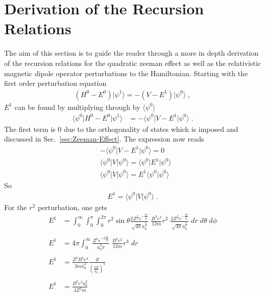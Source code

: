\chapter{Derivation of the Recursion Relations}
    The aim of this section is to guide the reader through a more in depth derivation of the recursion relations for the quadratic zeeman effect as well as the relativistic magnetic dipole operator perturbations to the Hamiltonian. Starting with the first order perturbation equation
    \begin{align}
        \left(H^0 - E^0 \right) \vert \psi^1 \rangle = -\left( V - E^1  \right) \vert \psi^0 \rangle\;,
    \end{align}
    \noindent $E^1$ can be found by multiplying through by $\langle \psi^0 \vert$
    \begin{align}
        \langle \psi^0 \vert H^0 - E^0 \vert \psi^1 \rangle &= -\langle \psi^0 \vert V - E^1 \vert \psi^0 \rangle \;.
    \end{align}
    \noindent The first term is $0$ due to the orthogonality of states which is imposed and discussed in Sec.~\ref{sec:Zeeman-Effect}. The expression now reads 
    \begin{align*}
        &-\langle \psi^0 \vert V - E^1 \vert \psi^0 \rangle = 0 \\
        &\langle \psi^0 \vert V \vert \psi^0 \rangle =  \langle \psi^0 \vert E^1 \vert \psi^0 \rangle\\
        &\langle \psi^0 \vert V \vert \psi^0 \rangle =  E^1 \langle \psi^0 \vert \psi^0 \rangle
    \end{align*}
    \noindent So 
    \begin{align}
        E^1 = \langle \psi^0 \vert V \vert \psi^0 \rangle\;.
    \end{align}
    \noindent For the $r^2$ perturbation, one gets 
    \begin{align*}
        E^1 &= \int^\infty_0\int_0^\pi  \int_0^{2\pi} r^2 \sin\theta \frac{2Z^{\frac{3}{2}} e^{-\frac{Zr}{\bar{a}_0}}}{\sqrt{4\pi} \bar{a}_0^{\frac{3}{2}}} \; \frac{B^2e^2}{12m}r^2\;  \frac{2Z^{\frac{3}{2}} e^{-\frac{Zr}{\bar{a}_0}}}{\sqrt{4\pi} \bar{a}_0^{\frac{3}{2}}} \;dr\; d\theta\; d\phi\\ \nonumber\\
        E^1 &= {4\pi} \int_0^\infty \frac{Z^3 e^{-2\frac{Zr}{\bar{a}_0}}}{\bar{a}_0^3\pi} \; \frac{B^2e^2}{12m}r^4 \;dr\\ \nonumber\\
        E^1 &= \frac{Z^3 B^2 e^2}{3m\bar{a}_0^3} \frac{4!}{(\frac{2Z}{\bar{a}_0})^5} \\ \nonumber \\
        E^1 &= \frac{B^2 e^2 \bar{a}_0^2}{4Z^2m}
    \end{align*}
